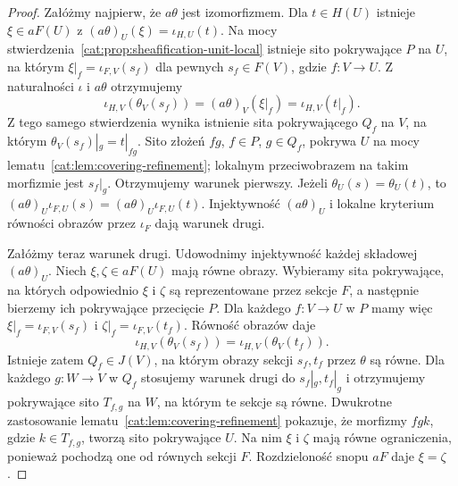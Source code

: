 \begin{proof}
Załóżmy najpierw, że $a\theta$ jest izomorfizmem. Dla $t\in H(U)$ istnieje $\xi\in aF(U)$ z $(a\theta)_U(\xi)=\iota_{H,U}(t)$. Na mocy stwierdzenia~\ref{cat:prop:sheafification-unit-local} istnieje sito pokrywające $P$ na $U$, na którym $\xi|_f=\iota_{F,V}(s_f)$ dla pewnych $s_f\in F(V)$, gdzie $f:V\to U$. Z naturalności $\iota$ i $a\theta$ otrzymujemy
\[
 \iota_{H,V}(\theta_V(s_f))
 =(a\theta)_V(\xi|_f)
 =\iota_{H,V}(t|_f).
\]
Z tego samego stwierdzenia wynika istnienie sita pokrywającego $Q_f$ na $V$, na którym $\theta_V(s_f)|_g=t|_{fg}$. Sito złożeń $fg$, $f\in P$, $g\in Q_f$, pokrywa $U$ na mocy lematu~\ref{cat:lem:covering-refinement}; lokalnym przeciwobrazem na takim morfizmie jest $s_f|_g$. Otrzymujemy warunek pierwszy. Jeżeli $\theta_U(s)=\theta_U(t)$, to $(a\theta)_U\iota_{F,U}(s)=(a\theta)_U\iota_{F,U}(t)$. Injektywność $(a\theta)_U$ i lokalne kryterium równości obrazów przez $\iota_F$ dają warunek drugi.

Załóżmy teraz warunek drugi. Udowodnimy injektywność każdej składowej $(a\theta)_U$. Niech $\xi,\zeta\in aF(U)$ mają równe obrazy. Wybieramy sita pokrywające, na których odpowiednio $\xi$ i $\zeta$ są reprezentowane przez sekcje $F$, a następnie bierzemy ich pokrywające przecięcie $P$. Dla każdego $f:V\to U$ w $P$ mamy więc $\xi|_f=\iota_{F,V}(s_f)$ i $\zeta|_f=\iota_{F,V}(t_f)$. Równość obrazów daje
\[
 \iota_{H,V}(\theta_V(s_f))=\iota_{H,V}(\theta_V(t_f)).
\]
Istnieje zatem $Q_f\in J(V)$, na którym obrazy sekcji $s_f,t_f$ przez $\theta$ są równe. Dla każdego $g:W\to V$ w $Q_f$ stosujemy warunek drugi do $s_f|_g,t_f|_g$ i otrzymujemy pokrywające sito $T_{f,g}$ na $W$, na którym te sekcje są równe. Dwukrotne zastosowanie lematu~\ref{cat:lem:covering-refinement} pokazuje, że morfizmy $fgk$, gdzie $k\in T_{f,g}$, tworzą sito pokrywające $U$. Na nim $\xi$ i $\zeta$ mają równe ograniczenia, ponieważ pochodzą one od równych sekcji $F$. Rozdzieloność snopu $aF$ daje $\xi=\zeta$.


\end{proof}
